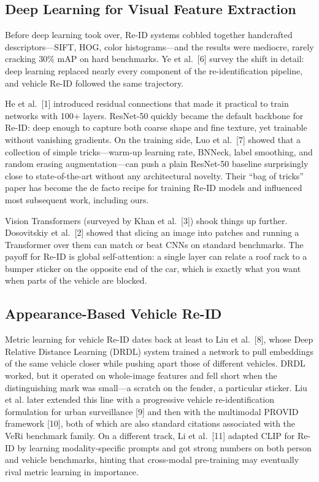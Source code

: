 \documentclass{ijitcs}
\newcommand{\rev}[1]{#1}
\begin{document}
\subsection{Deep Learning for Visual Feature Extraction}
Before deep learning took over, Re-ID systems cobbled together handcrafted descriptors---SIFT, HOG, color histograms---and the results were mediocre, rarely cracking 30\% mAP on hard benchmarks. Ye et al.\ [6] survey the shift in detail: deep learning replaced nearly every component of the re-identification pipeline, and vehicle Re-ID followed the same trajectory.

He et al.\ [1] introduced residual connections that made it practical to train networks with 100+ layers. ResNet-50 quickly became the default backbone for Re-ID: deep enough to capture both coarse shape and fine texture, yet trainable without vanishing gradients. On the training side, Luo et al.\ [7] showed that a collection of simple tricks---warm-up learning rate, BNNeck, label smoothing, and random erasing augmentation---can push a plain ResNet-50 baseline surprisingly close to state-of-the-art without any architectural novelty. Their ``bag of tricks'' paper has become the de facto recipe for training Re-ID models and influenced most subsequent work, including ours.

Vision Transformers (surveyed by Khan et al.\ [3]) shook things up further. Dosovitskiy et al.\ [2] showed that slicing an image into patches and running a Transformer over them can match or beat CNNs on standard benchmarks. The payoff for Re-ID is global self-attention: a single layer can relate a roof rack to a bumper sticker on the opposite end of the car, which is exactly what you want when parts of the vehicle are blocked.

\subsection{Appearance-Based Vehicle Re-ID}
Metric learning for vehicle Re-ID dates back at least to Liu et al.\ [8], whose Deep Relative Distance Learning (DRDL) system trained a network to pull embeddings of the same vehicle closer while pushing apart those of different vehicles. DRDL worked, but it operated on whole-image features and fell short when the distinguishing mark was small---a scratch on the fender, a particular sticker. \rev{Liu et al. later extended this line with a progressive vehicle re-identification formulation for urban surveillance [9] and then with the multimodal PROVID framework [10], both of which are also standard citations associated with the VeRi benchmark family.} On a different track, Li et al.\ [11] adapted CLIP for Re-ID by learning modality-specific prompts and got strong numbers on both person and vehicle benchmarks, hinting that cross-modal pre-training may eventually rival metric learning in importance.
\end{document}
